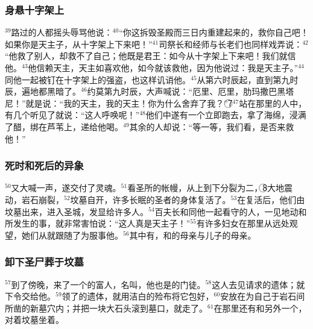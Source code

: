 \subsubsection{身悬十字架上}
$^{39}$路过的人都摇头辱骂他说：$^{40}$“你这拆毁圣殿而三日内重建起来的，救你自己吧！如果你是天主子，从十字架上下来吧！”$^{41}$司祭长和经师与长老们也同样戏弄说：$^{42}$“他救了别人，却救不了自己；他既是\UL[以色列]君王：如今从十字架上下来吧！我们就信他。$^{43}$他信赖天主，天主如喜欢他，如今就该救他，因为他说过：我是天主子。”$^{44}$同他一起被钉在十字架上的强盗，也这样讥诮他。$^{45}$从第六时辰起，直到第九时辰，遍地都黑暗了。$^{46}$约莫第九时辰，\UL[耶稣]大声喊说：“厄里、厄里，肋玛撒巴黑塔尼！”就是说：“我的天主，我的天主！你为什么舍弃了我？”\textcircled{7}$^{47}$站在那里的人中，有几个听见了就说：“这人呼唤\UL[厄里亚]呢！”$^{48}$他们中遂有一个立即跑去，拿了海绵，浸满了醋，绑在芦苇上，递给他喝。$^{49}$其余的人却说：“等一等，我们看，是否\UL[厄里亚]来救他！”


\subsubsection{死时和死后的异象}
$^{50}$\UL[耶稣]又大喊一声，遂交付了灵魂。$^{51}$看圣所的帐幔，从上到下分裂为二，\textcircled{8}大地震动，岩石崩裂，$^{52}$坟墓自开，许多长眠的圣者的身体复活了。$^{53}$在\UL[耶稣]复活后，他们由坟墓出来，进入圣城，发显给许多人。$^{54}$百夫长和同他一起看守\UL[耶稣]的人，一见地动和所发生的事，就非常害怕说：“这人真是天主子！”$^{55}$有许多妇女在那里从远处观望，她们从\UL[加里肋亚]就跟随了\UL[耶稣]为服事他。$^{56}$其中有\UL[玛利亚]\UL[玛达肋纳]，\UL[雅各伯]和\UL[若瑟]的母亲\UL[玛利亚]与\UL[载伯德]儿子的母亲。


\subsubsection{卸下圣尸葬于坟墓}
$^{57}$到了傍晚，来了一个\UL[阿黎玛特雅]的富人，名叫\UL[若瑟]，他也是\UL[耶稣]的门徒。$^{58}$这人去见\UL[比拉多]请求\UL[耶稣]的遗体；\UL[比拉多]就下令交给他。$^{59}$\UL[若瑟]领了\UL[耶稣]的遗体，就用洁白的殓布将它包好，$^{60}$安放在为自己于岩石间所凿的新墓穴内；并把一块大石头滚到墓口，就走了。$^{61}$在那里还有\UL[玛利亚]\UL[玛达肋纳]和另外一个\UL[玛利亚]，对着坟墓坐着。


